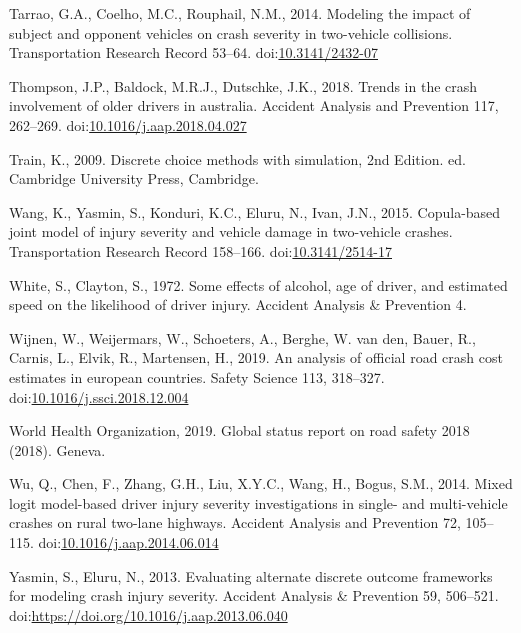\documentclass[]{elsarticle} %
\begin{document}
\leavevmode\hypertarget{ref-Tarrao2014modeling}{}%
Tarrao, G.A., Coelho, M.C., Rouphail, N.M., 2014. Modeling the impact of
subject and opponent vehicles on crash severity in two-vehicle
collisions. Transportation Research Record 53--64.
doi:\href{https://doi.org/10.3141/2432-07}{10.3141/2432-07}

\leavevmode\hypertarget{ref-Thompson2018trends}{}%
Thompson, J.P., Baldock, M.R.J., Dutschke, J.K., 2018. Trends in the
crash involvement of older drivers in australia. Accident Analysis and
Prevention 117, 262--269.
doi:\href{https://doi.org/10.1016/j.aap.2018.04.027}{10.1016/j.aap.2018.04.027}

\leavevmode\hypertarget{ref-Train2009discrete}{}%
Train, K., 2009. Discrete choice methods with simulation, 2nd Edition.
ed. Cambridge University Press, Cambridge.

\leavevmode\hypertarget{ref-Wang2015copula}{}%
Wang, K., Yasmin, S., Konduri, K.C., Eluru, N., Ivan, J.N., 2015.
Copula-based joint model of injury severity and vehicle damage in
two-vehicle crashes. Transportation Research Record 158--166.
doi:\href{https://doi.org/10.3141/2514-17}{10.3141/2514-17}

\leavevmode\hypertarget{ref-White1972effects}{}%
White, S., Clayton, S., 1972. Some effects of alcohol, age of driver,
and estimated speed on the likelihood of driver injury. Accident
Analysis \& Prevention 4.

\leavevmode\hypertarget{ref-Wijnen2019analysis}{}%
Wijnen, W., Weijermars, W., Schoeters, A., Berghe, W. van den, Bauer,
R., Carnis, L., Elvik, R., Martensen, H., 2019. An analysis of official
road crash cost estimates in european countries. Safety Science 113,
318--327.
doi:\href{https://doi.org/10.1016/j.ssci.2018.12.004}{10.1016/j.ssci.2018.12.004}

\leavevmode\hypertarget{ref-WHO2019global}{}%
World Health Organization, 2019. Global status report on road safety
2018 (2018). Geneva.

\leavevmode\hypertarget{ref-Wu2014mixed}{}%
Wu, Q., Chen, F., Zhang, G.H., Liu, X.Y.C., Wang, H., Bogus, S.M., 2014.
Mixed logit model-based driver injury severity investigations in single-
and multi-vehicle crashes on rural two-lane highways. Accident Analysis
and Prevention 72, 105--115.
doi:\href{https://doi.org/10.1016/j.aap.2014.06.014}{10.1016/j.aap.2014.06.014}

\leavevmode\hypertarget{ref-Shamsunnahar2013evaluating}{}%
Yasmin, S., Eluru, N., 2013. Evaluating alternate discrete outcome
frameworks for modeling crash injury severity. Accident Analysis \&
Prevention 59, 506--521.
doi:\href{https://doi.org/https://doi.org/10.1016/j.aap.2013.06.040}{https://doi.org/10.1016/j.aap.2013.06.040}
\end{document}
